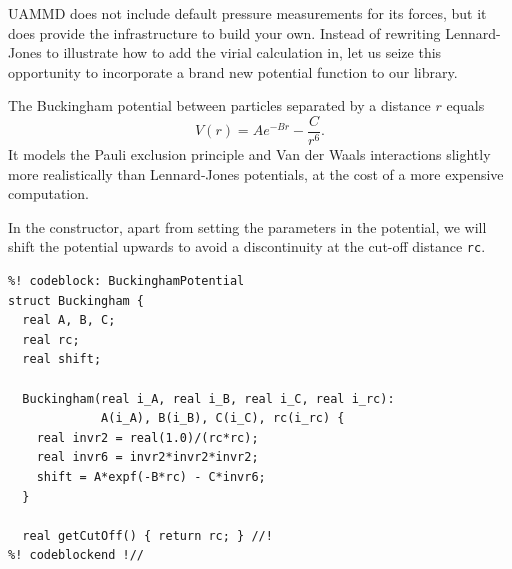 UAMMD does not include default pressure measurements for its forces, but it does 
provide the infrastructure to build your own. Instead of rewriting Lennard-Jones 
to illustrate how to add the virial calculation in, let us seize this 
opportunity to incorporate a brand new potential function to our library.

The Buckingham potential between particles separated by a distance $r$ equals
\begin{equation*}
  V(r) = Ae^{-Br} - \frac{C}{r^6}.
\end{equation*}
It models the Pauli exclusion principle and Van der Waals interactions slightly 
more realistically than Lennard-Jones potentials, at the cost of a more 
expensive computation.

In the constructor, apart from setting the parameters in the potential, we will 
shift the potential upwards to avoid a discontinuity at the cut-off distance 
\texttt{rc}.
\begin{lstlisting}
%! codeblock: BuckinghamPotential
struct Buckingham {
  real A, B, C;
  real rc;
  real shift;

  Buckingham(real i_A, real i_B, real i_C, real i_rc):
             A(i_A), B(i_B), C(i_C), rc(i_rc) {
    real invr2 = real(1.0)/(rc*rc);
    real invr6 = invr2*invr2*invr2;
    shift = A*expf(-B*rc) - C*invr6;
  }

  real getCutOff() { return rc; } //!
%! codeblockend !//
\end{lstlisting}

